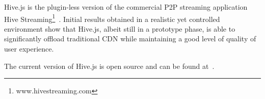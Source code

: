 \documentclass{sig-alternate}
\begin{document}
Hive.js is the plugin-less version of the commercial P2P streaming application Hive
Streaming\footnote{www.hivestreaming.com}~\cite{roverso2013http}. Initial results obtained
in a realistic yet controlled environment show that Hive.js, albeit still in a prototype
phase, is able to significantly offload traditional CDN while maintaining a good level of
quality of user experience.

The current version of Hive.js is open source and can be found at~\cite{hive-repo}.




\end{document}
